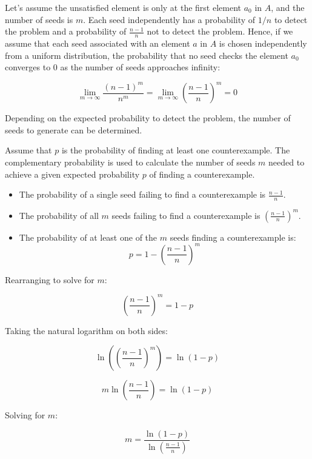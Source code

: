 \documentclass[runningheads]{llncs}
\begin{document}
Let's assume the unsatisfied element is only at the first element $a_0$ in $A$, and the number of seeds is $m$. Each seed independently has a probability of $1/n$ to detect the problem and a probability of $\frac{n-1}{n}$ not to detect the problem. Hence, if we assume that each seed associated with an element $a$ in $A$ is chosen independently from a uniform distribution, the probability that no seed checks the element $a_0$ converges to $0$ as the number of seeds approaches infinity:

\[
  \lim_{m \to \infty} \frac{(n-1)^m}{n^m} = \lim_{m \to \infty} \left( \frac{n-1}{n} \right)^m = 0
\]

Depending on the expected probability to detect the problem, the number of seeds to generate can be determined. 

Assume that $p$ is the probability of finding at least one counterexample. The complementary probability is used to calculate the number of seeds $m$ needed to achieve a given expected probability $p$ of finding a counterexample.
\begin{itemize}
\item The probability of a single seed failing to find a counterexample is $\frac{n-1}{n}$.
\item The probability of all $m$ seeds failing to find a counterexample is $\left(\frac{n-1}{n}\right)^m$.
\item The probability of at least one of the $m$ seeds finding a counterexample is:
\[
p = 1 - \left(\frac{n-1}{n}\right)^m
\]
\end{itemize}  

Rearranging to solve for \( m \):

\[
\left(\frac{n-1}{n}\right)^m = 1 - p
\]

Taking the natural logarithm on both sides:

\[
\ln\left(\left(\frac{n-1}{n}\right)^m\right) = \ln(1 - p)
\]

\[
m \ln\left(\frac{n-1}{n}\right) = \ln(1 - p)
\]

Solving for \( m \):

\[
m = \frac{\ln(1 - p)}{\ln\left(\frac{n-1}{n}\right)}
\]


\end{document}
